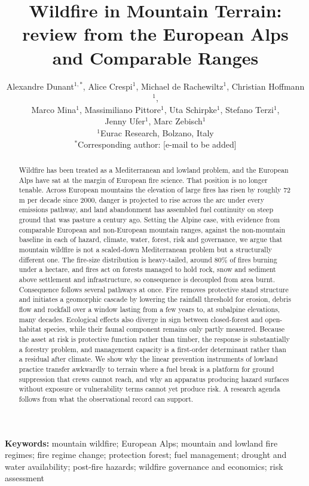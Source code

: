 \documentclass[11pt,a4paper]{article}
\title{
Wildfire in Mountain Terrain:\\
review from the European Alps and Comparable Ranges
}
\author{
Alexandre Dunant$^{1,*}$, Alice Crespi$^{1}$, Michael de Rachewiltz$^{1}$, Christian Hoffmann$^{1}$,\\
Marco Mina$^{1}$, Massimiliano Pittore$^{1}$, Uta Schirpke$^{1}$, Stefano Terzi$^{1}$,\\
Jenny Ufer$^{1}$, Marc Zebisch$^{1}$ \\
\small $^{1}$Eurac Research, Bolzano, Italy \\
\small $^{*}$Corresponding author: [e-mail to be added]
}
\date{}
\begin{document}
\maketitle


\begin{abstract}
\noindent
Wildfire has been treated as a Mediterranean and lowland problem, and the European Alps have sat at the margin of European fire science. That position is no longer tenable. Across European mountains the elevation of large fires has risen by roughly 72\,m per decade since 2000, danger is projected to rise across the arc under every emissions pathway, and land abandonment has assembled fuel continuity on steep ground that was pasture a century ago. Setting the Alpine case, with evidence from comparable European and non-European mountain ranges, against the non-mountain baseline in each of hazard, climate, water, forest, risk and governance, we argue that mountain wildfire is not a scaled-down Mediterranean problem but a structurally different one. The fire-size distribution is heavy-tailed, around 80\% of fires burning under a hectare, and fires act on forests managed to hold rock, snow and sediment above settlement and infrastructure, so consequence is decoupled from area burnt. Consequence follows several pathways at once. Fire removes protective stand structure and initiates a geomorphic cascade by lowering the rainfall threshold for erosion, debris flow and rockfall over a window lasting from a few years to, at subalpine elevations, many decades. Ecological effects also diverge in sign between closed-forest and open-habitat species, while their faunal component remains only partly measured. Because the asset at risk is protective function rather than timber, the response is substantially a forestry problem, and management capacity is a first-order determinant rather than a residual after climate. We show why the linear prevention instruments of lowland practice transfer awkwardly to terrain where a fuel break is a platform for ground suppression that crews cannot reach, and why an apparatus producing hazard surfaces without exposure or vulnerability terms cannot yet produce risk. A research agenda follows from what the observational record can support.
\end{abstract}

\noindent\textbf{Keywords:}
mountain wildfire; European Alps; mountain and lowland fire regimes; fire regime change; protection forest; fuel management; drought and water availability; post-fire hazards; wildfire governance and economics; risk assessment
\end{document}
